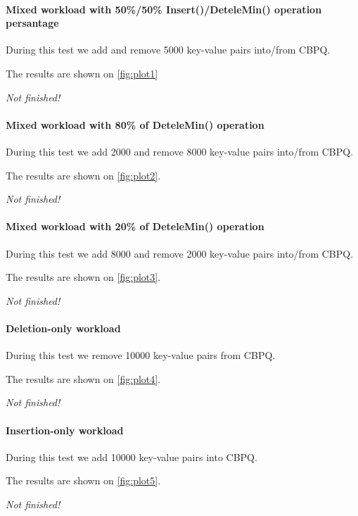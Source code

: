 \documentclass{article}
\begin{document}
\paragraph{Mixed workload with 50\%/50\% Insert()/DeteleMin() operation persantage}\mbox{}\par
During this test we add and remove 5000 key-value pairs into/from CBPQ.\par
The results are shown on \cref{fig:plot1}
\begin{center}
\textit{Not finished!}
\end{center}

\paragraph{Mixed workload with 80\% of DeteleMin() operation}\mbox{}\par
During this test we add 2000 and remove 8000 key-value pairs into/from CBPQ.\par
The results are shown on \cref{fig:plot2}.
\begin{center}
\textit{Not finished!}
\end{center}

\paragraph{Mixed workload with 20\% of DeteleMin() operation}\mbox{}\par
During this test we add 8000 and remove 2000 key-value pairs into/from CBPQ.\par
The results are shown on \cref{fig:plot3}.
\begin{center}
\textit{Not finished!}
\end{center}

\paragraph{Deletion-only workload}\mbox{}\par
During this test we remove 10000 key-value pairs from CBPQ.\par
The results are shown on \cref{fig:plot4}.
\begin{center}
\textit{Not finished!}
\end{center}

\paragraph{Insertion-only workload}\mbox{}\par
During this test we add 10000 key-value pairs into CBPQ.\par
The results are shown on \cref{fig:plot5}.
\begin{center}
\textit{Not finished!}
\end{center}
\end{document}

